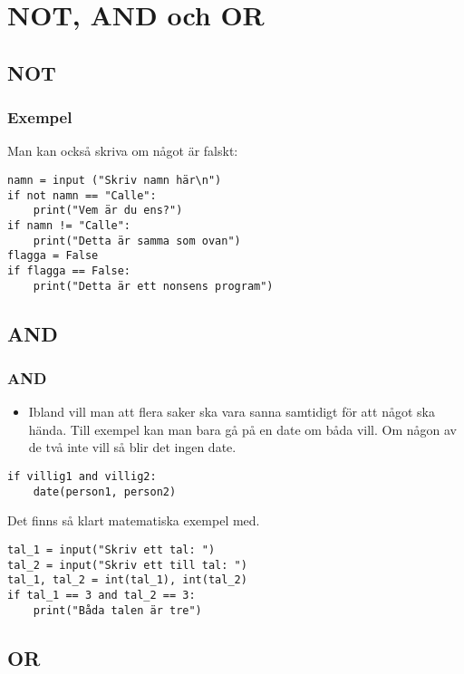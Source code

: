 \documentclass[aspectratio=169]{beamer}
\begin{document}
\section{NOT, AND och OR}

\subsection{NOT}

\begin{frame}[fragile]
	\frametitle{Exempel}
	
	Man kan också skriva om något är falskt:
	
	\begin{lstlisting}
namn = input ("Skriv namn här\n")
if not namn == "Calle":
    print("Vem är du ens?")
if namn != "Calle":
    print("Detta är samma som ovan")
flagga = False
if flagga == False:
    print("Detta är ett nonsens program")
	\end{lstlisting}

\end{frame}

\subsection{AND}

\begin{frame}[fragile]
	\frametitle{AND}
	
	\begin{itemize}
		\item Ibland vill man att flera saker ska vara sanna samtidigt för att något ska hända. Till exempel kan man bara gå på en date om båda vill. Om någon av de två inte vill så blir det ingen date.
	\end{itemize}
	
	\begin{lstlisting}
if villig1 and villig2:
    date(person1, person2)
	\end{lstlisting}
	\pause
	
	Det finns så klart matematiska exempel med.
	
	\begin{lstlisting}
tal_1 = input("Skriv ett tal: ")
tal_2 = input("Skriv ett till tal: ")
tal_1, tal_2 = int(tal_1), int(tal_2)
if tal_1 == 3 and tal_2 == 3:
    print("Båda talen är tre")
	\end{lstlisting}
\end{frame}

\subsection{OR}
\end{document}
